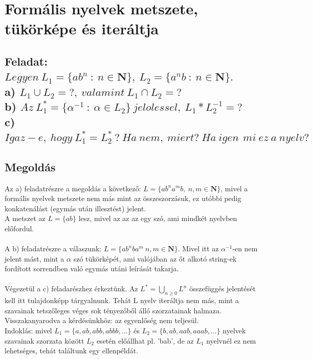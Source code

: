 \documentclass[12pt]{article}
\begin{document}
\section{Formális nyelvek metszete, tükörképe és iteráltja}
\subsection{Feladat: \\
$ Legyen \ L_{1}=\{ ab^{n} \ : \ n \in \mathbf{N} \}, \ L_{2}=\{ a^{n}b \ : \ n \in \mathbf{N} \} .$ \\
a) $ L_{1} \cup L_{2} = ?, \ valamint\ L_{1} \cap L_{2} = ? $ \\
b) $ Az \ L_{1}^{*} = \{\alpha^{-1} \ : \ \alpha \in L_{2} \} \ jelolessel, \ L_{1}*L_{2}^{-1}=? $ \\
c) $ Igaz-e, \ hogy \ L_{1}^{*}=L_{2}^{*} \ ? \ Ha\ nem,\ miert?\ Ha\ igen\,\ mi\ ez\ a\ nyelv? $}
\maketitle
\subsection{Megoldás}
Az a) feladatrészre a megoldás a következő: $ L = \{ ab^{n}a^{m}b, \ n,m \in \mathbf{N} \}$, 
mivel a formális nyelvek metszete nem más
mint az összeszorzásuk, ez utóbbi pedig konkatenálást (egymás után illesztést) jelent. \\
A metszet az $ L=\{ ab \} $ lesz, mivel az az az egy szó, ami mindkét nyelvben előfordul. \\\\
A b) feladatrészre a válaszunk: $ L = \{ ab^{n}ba^{m} \ n,m \in \mathbf{N} \} $.
Mivel itt az $ \alpha^{-1} $-en nem jelent mást, mint a $ \alpha $ szó tükörképét, ami valójában az őt alkotó
string-ek fordított sorrendben való egymás utáni leírását takarja. \\\\
Végezetül a c) feladarészhez érkeztünk. Az $ L^{*} = \bigcup_{n \geq 0} L^{n} $ összefüggés jelentését
kell itt tulajdonképp tárgyalnunk. Tehát L nyelv iteráltja nem más, mint a szavainak tetszőleges véges sok
tényezőből álló szorzatainak halmaza. Visszakanyarodva a kérdésünkhöz: az egyenlőség nem teljesül. \\
Indoklás: mivel $ L_{1}=\{ a, ab, abb, abbb, ... \} $ és $ L_{2}=\{ b, ab, aab, aaab, ... \} $ nyelvek szavainak
szorzata között $L_{2}$ esetén előállhat pl. 'bab', de az $L_{1}$ nyelvnél ez nem lehetséges, tehát találtunk
egy ellenpéldát.
\end{document}
